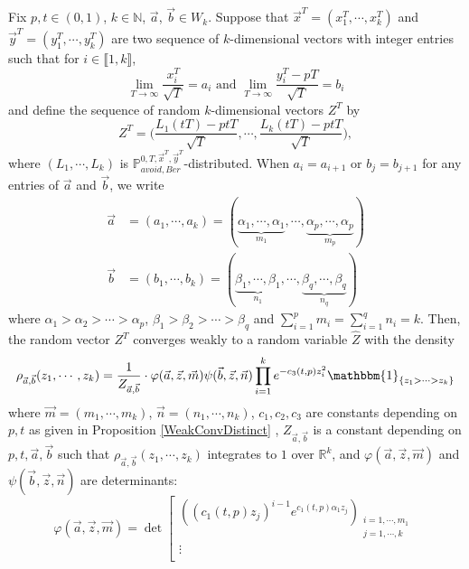 \begin{lemma}\label{prob17}
Fix $p,t\in(0,1)$, $k\in\mathbb{N}$, $\vec a$, $\vec b\in W_k$.  Suppose that $\vec{x}^{T}=(x_{1}^{T},\cdots,x_{k}^{T})$ and $\vec{y}^{T}=(y_{1}^{T},\cdots,y_{k}^{T})$ are two sequence of $k$-dimensional vectors with integer entries such that for $i\in \llbracket 1,k\rrbracket$, $$\lim_{T\rightarrow\infty}\frac{x_{i}^{T}}{\sqrt{T}}=a_{i} \text{ and } \lim_{T\rightarrow\infty}\frac{y_{i}^{T}-pT}{\sqrt{T}}=b_{i}$$ and define the sequence of random $k$-dimensional vectors $Z^{T}$ by $$Z^{T}=\big(\frac{L_{1}(tT)-ptT}{\sqrt{T}},\cdots,\frac{L_{k}(tT)-ptT}{\sqrt{T}}\big),$$ where $(L_{1},\cdots,L_{k})$ is $\mathbb{P}^{0,T,\vec{x}^{T},\vec{y}^{T}}_{avoid,Ber}$-distributed. When $a_i=a_{i+1}$ or $b_{j}=b_{j+1}$ for any entries of $\vec a$ and $\vec b$, we write
\begin{equation*}\begin{split}
\vec{a}&=(a_{1},\cdots,a_{k})=(\underbrace{\alpha_{1},\cdots,\alpha_{1}}_{m_{1}},\cdots,\underbrace{\alpha_{p},\cdots,\alpha_{p}}_{m_{p}})\\
\vec{b}&=(b_{1},\cdots,b_{k})=(\underbrace{\beta_{1},\cdots,\beta_{1}}_{n_{1}},\cdots,\underbrace{\beta_{q},\cdots,\beta_{q}}_{n_{q}})
\end{split}
\end{equation*}
where $\alpha_{1}>\alpha_{2}>\cdots>\alpha_{p}$, $\beta_{1}>\beta_{2}>\cdots>\beta_{q}$ and $\sum_{i=1}^{p}m_{i}=\sum_{i=1}^{q}n_{i}=k$. Then, the random vector $Z^{T}$ converges weakly to a random variable $\hat Z$ with the density $$\rho_{\vec{a},\vec{b}}(z_{1},\cdots,z_{k})=\frac{1}{Z_{\vec{a},\vec{b}}}\cdot \varphi(\vec{a},\vec{z},\vec{m})\psi(\vec{b},\vec{z},\vec{n})\prod_{i=1}^{k}e^{-c_{3}(t,p)z_{i}^{2}}\mathbbm{1}_{\{z_{1}>\cdots> z_{k}\}}$$ where $\vec{m}=(m_{1},\cdots,m_{k})$, $\vec{n}=(n_{1},\cdots,n_{k})$, $c_{1},c_{2},c_{3}$ are constants depending on $p,t$ as given in Proposition \ref{WeakConvDistinct} , $Z_{\vec a,\vec b}$ is a constant depending on $p,t,\vec{a},\vec{b}$ such that $\rho_{\vec{a},\vec{b}}(z_{1},\cdots,z_{k})$ integrates to $1$ over $\mathbb{R}^{k}$, and $\varphi(\vec{a},\vec{z},\vec{m})$ and $\psi(\vec{b},\vec{z},\vec{n})$ are determinants:
\begin{equation*}
\varphi(\vec{a},\vec{z},\vec{m})= \det
\left[ \begin{array}{ccc}
((c_{1}(t,p)z_{j})^{i-1}e^{c_{1}(t,p)\alpha_{1}z_{j}})_{\substack{i=1,\cdots,m_{1}\\j=1,\cdots,k}}\\
\vdots\\

\end{array}
\end{equation*}
\end{lemma}
